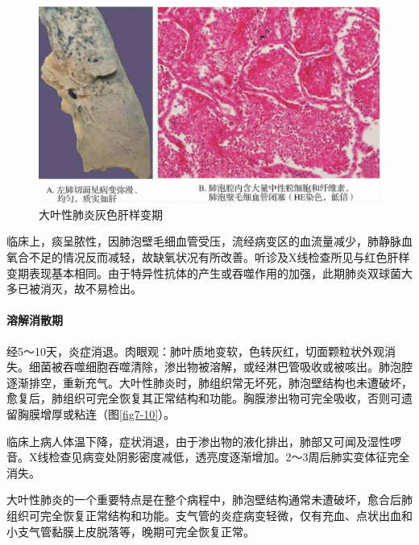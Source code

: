 \begin{figure}[!htbp]
 \centering
 \includegraphics{./images/Image00118.jpg}
 \captionsetup{justification=centering}
 \caption{大叶性肺炎灰色肝样变期}
 \label{fig7-9}
  \end{figure} 

临床上，痰呈脓性，因肺泡壁毛细血管受压，流经病变区的血流量减少，肺静脉血氧合不足的情况反而减轻，故缺氧状况有所改善。听诊及X线检查所见与红色肝样变期表现基本相同。由于特异性抗体的产生或吞噬作用的加强，此期肺炎双球菌大多已被消灭，故不易检出。

\paragraph{溶解消散期}
经5～10天，炎症消退。肉眼观：肺叶质地变软，色转灰红，切面颗粒状外观消失。细菌被吞噬细胞吞噬清除，渗出物被溶解，或经淋巴管吸收或被咳出。肺泡腔逐渐排空，重新充气。大叶性肺炎时，肺组织常无坏死，肺泡壁结构也未遭破坏，愈复后，肺组织可完全恢复其正常结构和功能。胸膜渗出物可完全吸收，否则可遗留胸膜增厚或粘连（图\ref{fig7-10}）。

临床上病人体温下降，症状消退，由于渗出物的液化排出，肺部又可闻及湿性啰音。X线检查见病变处阴影密度减低，透亮度逐渐增加。2～3周后肺实变体征完全消失。

大叶性肺炎的一个重要特点是在整个病程中，肺泡壁结构通常未遭破坏，愈合后肺组织可完全恢复正常结构和功能。支气管的炎症病变轻微，仅有充血、点状出血和小支气管黏膜上皮脱落等，晚期可完全恢复正常。

